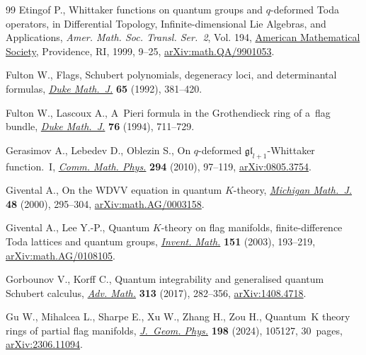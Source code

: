 \documentclass[pdftex]{sigma}
\numberwithin{equation}{section}
\theoremstyle{definition}
\begin{document}
\begin{thebibliography}{99}
Etingof P., Whittaker functions on quantum groups and {$q$}-deformed {T}oda
 operators, in Differential Topology, Infinite-dimensional {L}ie Algebras, and
 Applications, \textit{Amer. Math. Soc. Transl. Ser.~2}, Vol. 194,
 \href{https://doi.org/10.1090/trans2/194/02}{American Mathematical Society},
 Providence, RI, 1999, 9--25,
 \href{http://arxiv.org/abs/math.QA/9901053}{arXiv:math.QA/9901053}.

Fulton W., Flags, {S}chubert polynomials, degeneracy loci, and determinantal
 formulas, \href{https://doi.org/10.1215/S0012-7094-92-06516-1}{\textit{Duke
 Math.~J.}} \textbf{65} (1992), 381--420.

Fulton W., Lascoux A., A~{P}ieri formula in the {G}rothendieck ring of a~flag
 bundle, \href{https://doi.org/10.1215/S0012-7094-94-07627-8}{\textit{Duke
 Math.~J.}} \textbf{76} (1994), 711--729.

Gerasimov A., Lebedev D., Oblezin S., On {$q$}-deformed
 {${\mathfrak{gl}}_{l+1}$}-{W}hittaker function.~{I},
 \href{https://doi.org/10.1007/s00220-009-0917-y}{\textit{Comm. Math. Phys.}}
 \textbf{294} (2010), 97--119,
 \href{http://arxiv.org/abs/0805.3754}{arXiv:0805.3754}.

Givental A., On the {WDVV} equation in quantum {$K$}-theory,
 \href{https://doi.org/10.1307/mmj/1030132720}{\textit{Michigan Math.~J.}}
 \textbf{48} (2000), 295--304,
 \href{http://arxiv.org/abs/math.AG/0003158}{arXiv:math.AG/0003158}.

Givental A., Lee Y.-P., Quantum {$K$}-theory on flag manifolds,
 finite-difference {T}oda lattices and quantum groups,
 \href{https://doi.org/10.1007/s00222-002-0250-y}{\textit{Invent. Math.}}
 \textbf{151} (2003), 193--219,
 \href{http://arxiv.org/abs/math.AG/0108105}{arXiv:math.AG/0108105}.

Gorbounov V., Korff C., Quantum integrability and generalised quantum
 {S}chubert calculus,
 \href{https://doi.org/10.1016/j.aim.2017.03.030}{\textit{Adv. Math.}}
 \textbf{313} (2017), 282--356,
 \href{http://arxiv.org/abs/1408.4718}{arXiv:1408.4718}.

Gu W., Mihalcea L., Sharpe E., Xu W., Zhang H., Zou H., Quantum~{K} theory
 rings of partial flag manifolds,
 \href{https://doi.org/10.1016/j.geomphys.2024.105127}{\textit{J.~Geom.
 Phys.}} \textbf{198} (2024), 105127, 30~pages,
 \href{http://arxiv.org/abs/2306.11094}{arXiv:2306.11094}.


\end{thebibliography}
\end{document}
